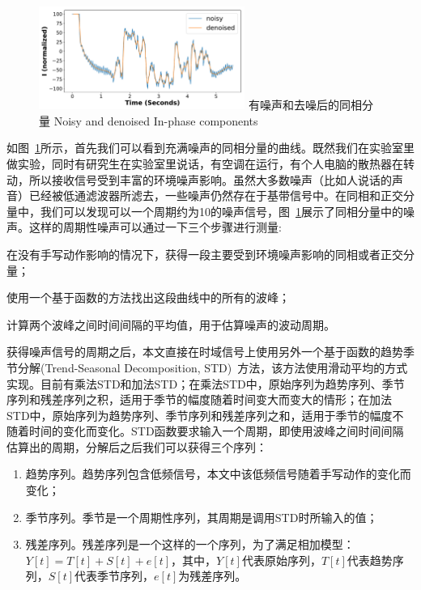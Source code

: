 \begin{figure}[!htp]
  \centering
  \includegraphics[width=0.6\textwidth]{figure/noisy-I.pdf}
  \bicaption
    {有噪声和去噪后的同相分量}
    {Noisy and denoised In-phase components}
  \label{fig:noisy-denoised-component}
\end{figure}
如图~\ref{fig:noisy-denoised-component}所示，首先我们可以看到充满噪声的同相分量的曲线。既然我们在实验室里做实验，同时有研究生在实验室里说话，有空调在运行，有个人电脑的散热器在转动，所以接收信号受到丰富的环境噪声影响。虽然大多数噪声（比如人说话的声音）已经被低通滤波器所滤去，一些噪声仍然存在于基带信号中。在同相和正交分量中，我们可以发现可以一个周期约为10的噪声信号，图~\ref{fig:noisy-denoised-component}展示了同相分量中的噪声。这样的周期性噪声可以通过一下三个步骤进行测量:
\begin{enumerate*}[label=(\arabic*)]
    \item 在没有手写动作影响的情况下，获得一段主要受到环境噪声影响的同相或者正交分量；
    \item 使用一个基于函数的方法找出这段曲线中的所有的波峰；
    \item 计算两个波峰之间时间间隔的平均值，用于估算噪声的波动周期。
\end{enumerate*}
获得噪声信号的周期之后，本文直接在时域信号上使用另外一个基于函数的趋势季节分解(Trend-Seasonal Decomposition, STD)~\cite{cleveland1990stl}方法，该方法使用滑动平均的方式实现。目前有乘法STD和加法STD；在乘法STD中，原始序列为趋势序列、季节序列和残差序列之积，适用于季节的幅度随着时间变大而变大的情形；在加法STD中，原始序列为趋势序列、季节序列和残差序列之和，适用于季节的幅度不随着时间的变化而变化。STD函数要求输入一个周期，即使用波峰之间时间间隔估算出的周期，分解后之后我们可以获得三个序列：
\begin{enumerate}[label=(\arabic*)]
    \item 趋势序列。趋势序列包含低频信号，本文中该低频信号随着手写动作的变化而变化；
    \item 季节序列。季节是一个周期性序列，其周期是调用STD时所输入的值；
    \item 残差序列。残差序列是一个这样的一个序列，为了满足相加模型：$Y[t] = T[t] + S[t] + e[t]$，其中，$Y[t]$代表原始序列，$T[t]$代表趋势序列，$S[t]$代表季节序列，$e[t]$为残差序列。
\end{enumerate}
